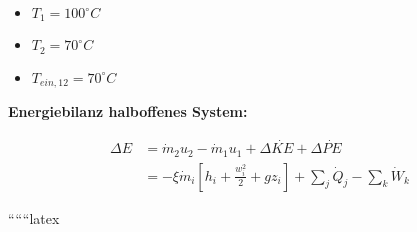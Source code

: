 \begin{itemize}
    \item $T_1 = 100^\circ C$
    \item $T_2 = 70^\circ C$
    \item $T_{ein,12} = 70^\circ C$
\end{itemize}

\textbf{Energiebilanz halboffenes System:}

\begin{align*}
    \Delta E &= \dot{m}_2 u_2 - \dot{m}_1 u_1 + \Delta \dot{KE} + \Delta \dot{PE} \\
    &= -\xi \dot{m}_i \left[ h_i + \frac{w_i^2}{2} + g z_i \right] + \sum_j \dot{Q}_j - \sum_k \dot{W}_k
\end{align*}

``````latex



